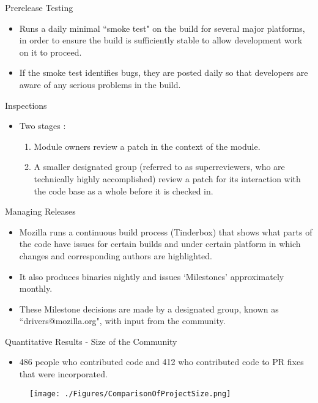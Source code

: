 \documentclass{beamer}
\begin{document}
\begin{frame}{Prerelease Testing}
\begin{itemize}
	\item Runs a daily minimal ``smoke test" on the build for several major platforms, in order to ensure the build is sufficiently stable to allow development work on it to proceed.\pause
	\item If the smoke test identifies bugs, they are posted daily so that developers are aware of any serious problems in the build. 
\end{itemize}
\end{frame}

\begin{frame}{Inspections}
\begin{itemize}
	\item Two stages :
	\begin{enumerate}
		\item Module owners review a patch in the context of the module. \pause
		\item A smaller designated group (referred to as superreviewers, who are technically highly accomplished) review a patch for its interaction with the code base as a whole before it is checked in.
	\end{enumerate}
\end{itemize}
\end{frame}

\begin{frame}{Managing Releases}
\begin{itemize}
	\item Mozilla runs a continuous build process (Tinderbox) that shows what parts of the code have issues for certain builds and under certain platform in which changes and corresponding authors are highlighted.\pause
	\item It also produces binaries nightly and issues `Milestones' approximately monthly. \pause
	\item These Milestone decisions are made by a designated group, known as ``drivers@mozilla.org", with input from the community.
\end{itemize}
\end{frame}

\begin{frame}{Quantitative Results - Size of the Community}
\begin{itemize}
	\item 486 people who contributed code and 412 who contributed code to PR fixes that were incorporated.\pause
\end{itemize}
\begin{figure}
	\texttt{[image: ./Figures/ComparisonOfProjectSize.png]}
\end{figure}
\end{frame}
\end{document}
